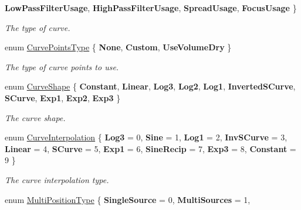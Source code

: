 \begin{DoxyCompactItemize}
{\bfseries Low\+Pass\+Filter\+Usage}, 
\newline
{\bfseries High\+Pass\+Filter\+Usage}, 
{\bfseries Spread\+Usage}, 
{\bfseries Focus\+Usage}
 \}
\begin{DoxyCompactList}\small\item\em The type of curve. \end{DoxyCompactList}\item 
enum \mbox{\hyperlink{class_waapi_c_s_1_1_custom_values_1_1_wwise_values_ae8b620ede7bbe13a8185450675c9ca75}{Curve\+Points\+Type}} \{ {\bfseries None}, 
{\bfseries Custom}, 
{\bfseries Use\+Volume\+Dry}
 \}
\begin{DoxyCompactList}\small\item\em The type of curve points to use. \end{DoxyCompactList}\item 
enum \mbox{\hyperlink{class_waapi_c_s_1_1_custom_values_1_1_wwise_values_a6a4ef16afabafaca1bd0c901c4103cf6}{Curve\+Shape}} \{ \newline
{\bfseries Constant}, 
{\bfseries Linear}, 
{\bfseries Log3}, 
{\bfseries Log2}, 
\newline
{\bfseries Log1}, 
{\bfseries Inverted\+S\+Curve}, 
{\bfseries S\+Curve}, 
{\bfseries Exp1}, 
\newline
{\bfseries Exp2}, 
{\bfseries Exp3}
 \}
\begin{DoxyCompactList}\small\item\em The curve shape. \end{DoxyCompactList}\item 
enum \mbox{\hyperlink{class_waapi_c_s_1_1_custom_values_1_1_wwise_values_a9014a599ab2b6e81b5e841de3603244d}{Curve\+Interpolation}} \{ \newline
{\bfseries Log3} = 0, 
{\bfseries Sine} = 1, 
{\bfseries Log1} = 2, 
{\bfseries Inv\+S\+Curve} = 3, 
\newline
{\bfseries Linear} = 4, 
{\bfseries S\+Curve} = 5, 
{\bfseries Exp1} = 6, 
{\bfseries Sine\+Recip} = 7, 
\newline
{\bfseries Exp3} = 8, 
{\bfseries Constant} = 9
 \}
\begin{DoxyCompactList}\small\item\em The curve interpolation type. \end{DoxyCompactList}\item 
enum \mbox{\hyperlink{class_waapi_c_s_1_1_custom_values_1_1_wwise_values_a6edfb755afdda63c2168e2528fbf107a}{Multi\+Position\+Type}} \{ {\bfseries Single\+Source} = 0, 
{\bfseries Multi\+Sources} = 1, 

\end{DoxyCompactItemize}

